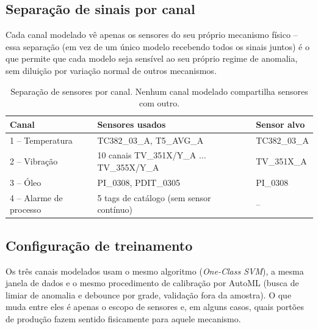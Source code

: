 \documentclass[11pt,a4paper]{article}
\begin{document}
\subsection{Separação de sinais por canal}

Cada canal modelado vê apenas os sensores do seu próprio mecanismo
físico -- essa separação (em vez de um único modelo recebendo todos
os sinais juntos) é o que permite que cada modelo seja sensível ao
seu próprio regime de anomalia, sem diluição por variação normal de
outros mecanismos.

\begin{table}[H]
\centering
\begin{tabular}{lll}
\toprule
\textbf{Canal} & \textbf{Sensores usados} & \textbf{Sensor alvo} \\
\midrule
1 -- Temperatura & TC382\_03\_A, T5\_AVG\_A & TC382\_03\_A \\
2 -- Vibração & 10 canais TV\_351X/Y\_A ... TV\_355X/Y\_A & TV\_351X\_A \\
3 -- Óleo & PI\_0308, PDIT\_0305 & PI\_0308 \\
4 -- Alarme de processo & 5 tags de catálogo (sem sensor contínuo) & -- \\
\bottomrule
\end{tabular}
\caption{Separação de sensores por canal. Nenhum canal modelado
compartilha sensores com outro.}
\end{table}

\subsection{Configuração de treinamento}

Os três canais modelados usam o mesmo algoritmo (\textit{One-Class
SVM}), a mesma janela de dados e o mesmo procedimento de calibração
por AutoML (busca de limiar de anomalia e debounce por grade,
validação fora da amostra). O que muda entre eles é apenas o escopo
de sensores e, em alguns casos, quais portões de produção fazem
sentido fisicamente para aquele mecanismo.
\end{document}
